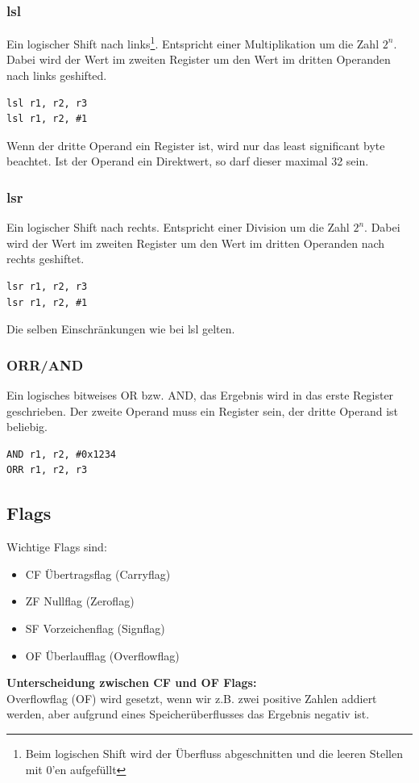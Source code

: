 \documentclass[a4paper,12pt,leqno]{article}
\begin{document}
\subsubsection{lsl}
Ein logischer Shift nach links\footnote{Beim logischen Shift wird der Überfluss abgeschnitten und die leeren Stellen mit 0'en aufgefüllt}. Entspricht einer Multiplikation um die Zahl $2^n$. Dabei wird der Wert im zweiten Register um den Wert im dritten Operanden nach links geshifted.
\begin{lstlisting}
lsl r1, r2, r3
lsl r1, r2, #1
\end{lstlisting}
Wenn der dritte Operand ein Register ist, wird nur das least significant byte beachtet. Ist der Operand ein Direktwert, so darf dieser maximal 32 sein.

\subsubsection{lsr}
Ein logischer Shift nach rechts. Entspricht einer Division um die Zahl $2^n$. Dabei wird der Wert im zweiten Register um den Wert im dritten Operanden nach rechts geshiftet.
\begin{lstlisting}
lsr r1, r2, r3
lsr r1, r2, #1
\end{lstlisting}
Die selben Einschränkungen wie bei lsl gelten.

\subsubsection{ORR/AND}
Ein logisches bitweises OR bzw. AND, das Ergebnis wird in das erste Register geschrieben. Der zweite Operand muss ein Register sein, der dritte Operand ist beliebig.
\begin{lstlisting}
AND r1, r2, #0x1234
ORR r1, r2, r3
\end{lstlisting}


\subsection{Flags}
Wichtige Flags sind:
\begin{itemize}
\item CF Übertragsflag (Carryflag)
\item ZF Nullflag (Zeroflag)
\item SF Vorzeichenflag (Signflag)
\item OF Überlaufflag (Overflowflag)
\end{itemize}

\textbf{Unterscheidung zwischen CF und OF Flags:}\\
Overflowflag (OF) wird gesetzt, wenn wir z.B. zwei positive Zahlen addiert werden, aber aufgrund eines Speicherüberflusses das Ergebnis negativ ist.\\
\end{document}
